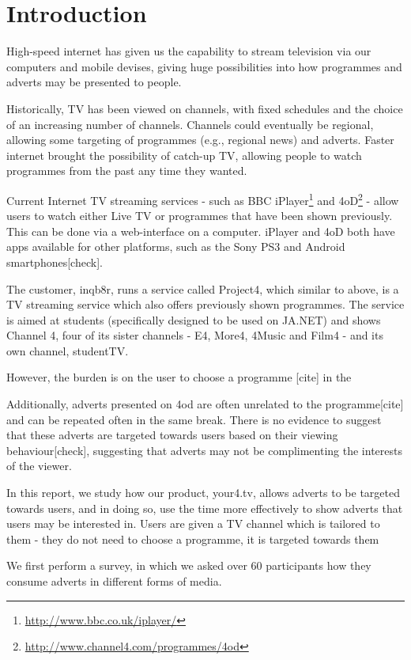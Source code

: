 \section{Introduction}
High-speed internet has given us the capability to stream television via our computers and mobile devises, giving huge possibilities into how programmes and adverts may be presented to people.

Historically, TV has been viewed on channels, with fixed schedules and the choice of an increasing number of channels. Channels could eventually be regional, allowing some targeting of programmes (e.g., regional news) and adverts. Faster internet brought the possibility of catch-up TV, allowing people to watch programmes from the past any time they wanted.

Current Internet TV streaming services - such as BBC iPlayer\footnote{\url{http://www.bbc.co.uk/iplayer/}} and 4oD\footnote{\url{http://www.channel4.com/programmes/4od}} - allow users to watch either Live TV or programmes that have been shown previously. This can be done via a web-interface on a computer. iPlayer and 4oD both have apps available for other platforms, such as the Sony PS3 and Android smartphones[check].

The customer, inqb8r, runs a service called Project4, which similar to above, is a TV streaming service which also offers previously shown programmes. The service is aimed at students (specifically designed to be used on JA.NET) and shows Channel 4, four of its sister channels - E4, More4, 4Music and Film4 - and its own channel, studentTV.

However, the burden is on the user to choose a programme [cite] in the

Additionally, adverts presented on 4od are often unrelated to the programme[cite] and can be repeated often in the same break. There is no evidence to suggest that these adverts are targeted towards users based on their viewing behaviour[check], suggesting that adverts may not be complimenting the interests of the viewer.

In this report, we study how our product, your4.tv, allows adverts to be targeted towards users, and in doing so, use the time more effectively to show adverts that users may be interested in. Users are given a TV channel which is tailored to them - they do not need to choose a programme, it is targeted towards them

We first perform a survey, in which we asked over 60 participants how they consume adverts in different forms of media.